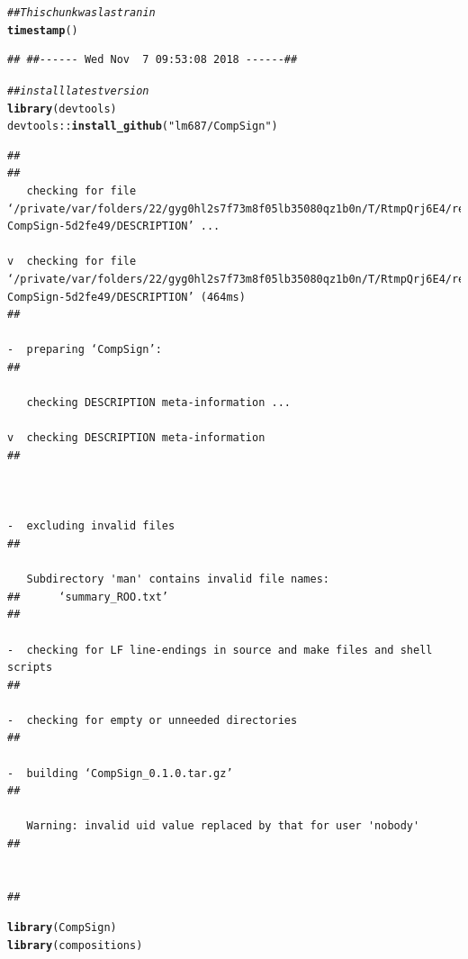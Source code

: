 \documentclass{article}\usepackage[]{graphicx}\usepackage[]{color}
\makeatletter
\newcommand{\hlstr}[1]{\textcolor[rgb]{0.192,0.494,0.8}{#1}}%
\newcommand{\hlcom}[1]{\textcolor[rgb]{0.678,0.584,0.686}{\textit{#1}}}%
\newcommand{\hlopt}[1]{\textcolor[rgb]{0,0,0}{#1}}%
\newcommand{\hlstd}[1]{\textcolor[rgb]{0.345,0.345,0.345}{#1}}%
\newcommand{\hlkwd}[1]{\textcolor[rgb]{0.737,0.353,0.396}{\textbf{#1}}}%
\newenvironment{kframe}{%
 \def\at@end@of@kframe{}%
 \ifinner\ifhmode%
  \def\at@end@of@kframe{\end{minipage}}%
  \begin{minipage}{\columnwidth}%
 \fi\fi%
 \def\FrameCommand##1{\hskip\@totalleftmargin \hskip-\fboxsep
 \colorbox{shadecolor}{##1}\hskip-\fboxsep
     \hskip-\linewidth \hskip-\@totalleftmargin \hskip\columnwidth}%
 \MakeFramed {\advance\hsize-\width
   \@totalleftmargin\z@ \linewidth\hsize
   \@setminipage}}%
 {\par\unskip\endMakeFramed%
 \at@end@of@kframe}
\newenvironment{knitrout}{}{} %
\makeatother
\begin{document}
\begin{knitrout}
\color{fgcolor}\begin{kframe}
\begin{alltt}
\hlcom{## This chunk was last ran in}
\hlkwd{timestamp}\hlstd{()}
\end{alltt}
\begin{verbatim}
## ##------ Wed Nov  7 09:53:08 2018 ------##
\end{verbatim}
\begin{alltt}
\hlcom{## install latest version}
\hlkwd{library}\hlstd{(devtools)}
\hlstd{devtools}\hlopt{::}\hlkwd{install_github}\hlstd{(}\hlstr{"lm687/CompSign"}\hlstd{)}
\end{alltt}


{\ttfamily\noindent\itshape\color{messagecolor}{\#\# Downloading GitHub repo lm687/CompSign@master}}\begin{verbatim}
## 
##   
   checking for file ‘/private/var/folders/22/gyg0hl2s7f73m8f05lb35080qz1b0n/T/RtmpQrj6E4/remotes3cb20486ec8/lm687-CompSign-5d2fe49/DESCRIPTION’ ...
  
v  checking for file ‘/private/var/folders/22/gyg0hl2s7f73m8f05lb35080qz1b0n/T/RtmpQrj6E4/remotes3cb20486ec8/lm687-CompSign-5d2fe49/DESCRIPTION’ (464ms)
## 
  
-  preparing ‘CompSign’:
## 
  
   checking DESCRIPTION meta-information ...
  
v  checking DESCRIPTION meta-information
## 
  
  
  
-  excluding invalid files
## 
  
   Subdirectory 'man' contains invalid file names:
##      ‘summary_ROO.txt’
## 
  
-  checking for LF line-endings in source and make files and shell scripts
## 
  
-  checking for empty or unneeded directories
## 
  
-  building ‘CompSign_0.1.0.tar.gz’
## 
  
   Warning: invalid uid value replaced by that for user 'nobody'
## 
  
   
## 
\end{verbatim}
\begin{alltt}
\hlkwd{library}\hlstd{(CompSign)}
\hlkwd{library}\hlstd{(compositions)}
\end{alltt}


{\ttfamily\noindent\itshape\color{messagecolor}{\#\# Loading required package: tensorA}}


\end{kframe}
\end{knitrout}
\end{document}
